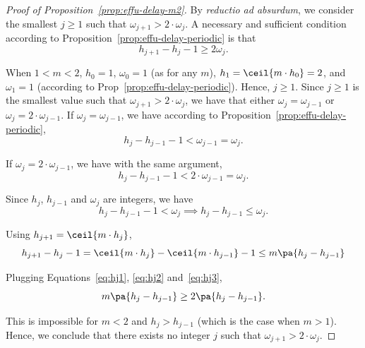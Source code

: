\begin{proof}[Proof of Proposition~\ref{prop:effu-delay-m2}]
By \emph{reductio ad absurdum}, we consider the smallest $j\geq 1$ such that  $\omega_{j+1} > 2\cdot \omega_{j}$. A necessary and sufficient condition according to Proposition~\ref{prop:effu-delay-periodic} is that 
\begin{equation}
\label{eq:hj1}
h_{j+1} - h_j -1 \geq  2\omega_j. 
\end{equation}

When $1<m<2$, $h_0=1$, $\omega_0=1$ (as for any $m$), $h_1 = \ceil{m\cdot h_0}  = 2$,  and $\omega_1 = 1$ (according to Prop~\ref{prop:effu-delay-periodic}). Hence, $j \geq 1$.  Since $j\geq 1$ is the smallest value such that $\omega_{j+1} > 2\cdot \omega_{j}$, we have that either $\omega_j = \omega_{j-1}$ or $\omega_j = 2 \cdot \omega_{j-1}$. If $\omega_j = \omega_{j-1}$, we have according to Proposition~\ref{prop:effu-delay-periodic},
\[
h_j - h_{j-1} -1   < \omega_{j-1} = \omega_j. 
\]

If $\omega_j = 2 \cdot \omega_{j-1}$, we have with the same argument, 
\[
h_j - h_{j-1} -1   < 2\cdot \omega_{j-1} = \omega_j. 
\]

Since $h_j$, $h_{j-1}$ and $\omega_j$ are integers, we have 
\begin{equation}
\label{eq:hj2}
 h_j - h_{j-1} -1   < \omega_j \implies h_j - h_{j-1} \leq \omega_j.
 \end{equation}

Using $h_{j+1} = \ceil{m \cdot h_j}$,
\begin{equation}
\label{eq:hj3}
h_{j+1} - h_j -1  = \ceil{m \cdot h_j} - \ceil{m \cdot h_{j-1}} -1 \leq m \pa{h_j - h_{j-1}}
 \end{equation}
 
 Plugging Equations~\ref{eq:hj1}, \ref{eq:hj2} and~\ref{eq:hj3}, 
 \[ m \pa{h_j - h_{j-1}} \geq 2\pa{h_j - h_{j-1}}. \]

This is impossible for $m<2$ and $h_j > h_{j-1}$ (which is the case when $m>1$).  Hence, we conclude that there exists no integer $j$ such that $\omega_{j+1} > 2 \cdot \omega_j$.

\end{proof}

